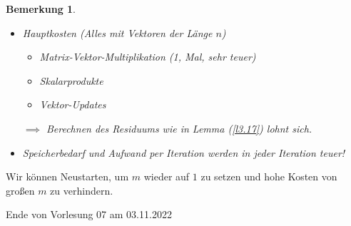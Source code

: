 \documentclass{book}
\newtheorem{remark}[algorithm]{Bemerkung}
\begin{document}
            \begin{remark}\label{b3.18}
                \begin{itemize}
                    \item Hauptkosten (Alles mit Vektoren der Länge \underline{$n$})
                        \begin{itemize}
                            \item Matrix-Vektor-Multiplikation (1, Mal, sehr teuer)
                            \item Skalarprodukte
                            \item Vektor-Updates
                        \end{itemize}
                    $\implies$ Berechnen des Residuums wie in Lemma (\ref{l3.17}) lohnt sich.
                    \item Speicherbedarf und Aufwand per Iteration werden in jeder Iteration teuer!
                \end{itemize}
            \end{remark}

            \begin{tcolorbox}[enhanced,breakable,
                title=Umgehen von großen $m$]
                Wir können Neustarten, um $m$ wieder auf $1$ zu setzen und hohe Kosten von großen $m$ zu verhindern.
            \end{tcolorbox}

            \noindent
            \xrfill[0.7ex]{1pt}Ende von Vorlesung 07 am 03.11.2022\xrfill[0.7ex]{1pt}
            
\end{document}

